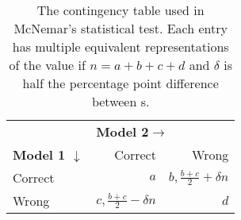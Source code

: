 \begin{table}[t]
    \centering
    \begin{tabular}{l r r}
        \toprule
                                      & \multicolumn{2}{l}{\textbf{Model 2$\rightarrow$}}                              \\
        \textbf{Model 1 $\downarrow$} & Correct                                           & Wrong                      \\
        \midrule
        Correct                       & $a$                                               & $b,\frac{b+c}{2}+\delta n$ \\
        Wrong                         & $c,\frac{b+c}{2}-\delta n$                        & $d$                        \\
        \bottomrule
    \end{tabular}
    \caption{The contingency table used in McNemar's statistical test.
        Each entry has multiple equivalent representations of the value if $n=a+b+c+d$ and $\delta$ is half the percentage point difference between \subj{}s.
    }
    \label{tab:contingency}
\end{table}